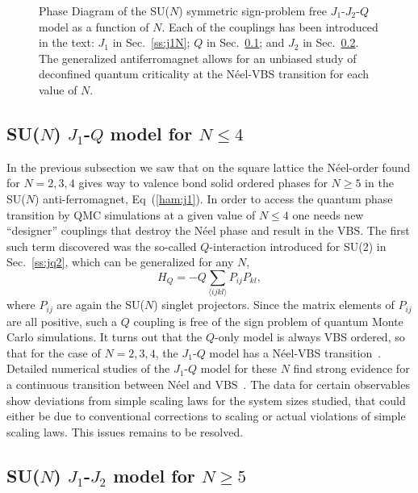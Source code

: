 \documentclass[range]{ar2e}
\begin{document}
\begin{figure}
\centerline{}
  \caption{ \label{fig:pdj1j2q} Phase Diagram of the
    SU($N$) symmetric sign-problem free
    $J_1$-$J_2$-$Q$ model as a function of $N$. Each of the couplings has been introduced
    in the text: $J_1$ in Sec.~\ref{ss:j1N}; $Q$ in Sec.~\ref{ss:jqN};
  and $J_2$ in Sec.~\ref{ss:j1j2N}. The generalized antiferromagnet
  allows for an unbiased study of deconfined quantum
  criticality at the N\'eel-VBS transition for each value of $N$. }
\end{figure}


\subsection{SU($N$) $J_1$-$Q$ model for $N\leq 4$}
\label{ss:jqN}
In the previous subsection we saw that on the square lattice the
N\'eel-order found for $N=2,3,4$ gives way to valence bond solid
ordered phases for $N\geq 5$ in the SU($N$)
anti-ferromagnet, Eq~(\ref{ham:j1}). In order to access the quantum
phase transition by QMC simulations at a given value of $N\leq 4$ one needs new
``designer'' couplings that
destroy the N\'eel phase and result in the VBS. The first such term discovered was
the so-called $Q$-interaction introduced for SU(2) in Sec.~\ref{ss:jq2}, which can be generalized for any $N$,
\begin{equation}
H_{Q} = - Q \sum_{\langle ijkl \rangle}P_{ij} P_{kl}, 
\end{equation}
where $P_{ij}$ are again the SU($N$) singlet projectors. Since the matrix elements of $P_{ij}$ are all positive, such a $Q$
coupling is free of the sign problem of quantum Monte Carlo
simulations. It turns out that the $Q$-only model is always VBS ordered, so that for the case of $N=2,3,4$, the $J_1$-$Q$ model has a N\'eel-VBS transition~\cite{Sandvik07,lou2009:sun}.
Detailed numerical studies of the $J_1$-$Q$ model for these $N$ find strong evidence for a continuous transition between N\'eel and VBS~\cite{melko2008:jq,kaul2011:su34,banerjee2010:log,banerjee2010:su3}. The data for certain observables
show deviations from simple scaling laws for the system sizes studied, that could either be due to conventional corrections to scaling or actual violations of simple scaling laws. This issues remains to be resolved.


\subsection{SU($N$) $J_1$-$J_2$ model for $N\geq 5$}
\label{ss:j1j2N}
\end{document}
